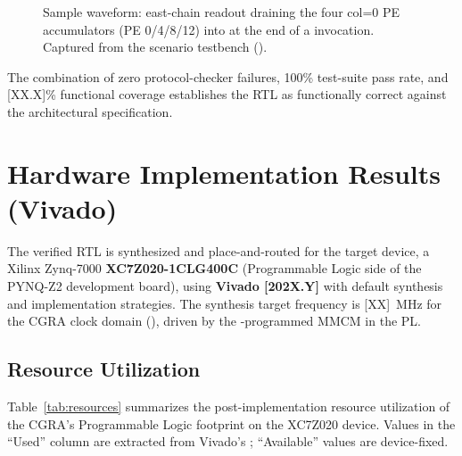 \begin{figure}[!htbp]
\centering
{}
\caption{Sample waveform: east-chain readout draining the four
col=0 PE accumulators (PE 0/4/8/12) into 
at the end of a  invocation. Captured
from the  scenario testbench
().}
\label{fig:wave-fcgroup}
\end{figure}

The combination of zero protocol-checker failures, 100\% test-suite
pass rate, and [XX.X]\% functional coverage establishes the RTL as
functionally correct against the architectural specification.

\section{Hardware Implementation Results (Vivado)}
\label{sec:ch5-impl}

The verified RTL is synthesized and place-and-routed for the target
device, a Xilinx Zynq-7000 \textbf{XC7Z020-1CLG400C} (Programmable
Logic side of the PYNQ-Z2 development board), using
\textbf{Vivado [202X.Y]} with default synthesis and implementation
strategies. The synthesis target frequency is [XX]~MHz for the CGRA
clock domain (), driven by the
-programmed MMCM in the PL.

\subsection{Resource Utilization}
\label{ssec:resources}

Table~\ref{tab:resources} summarizes the post-implementation
resource utilization of the CGRA's Programmable Logic footprint on
the XC7Z020 device. Values in the ``Used'' column are extracted from
Vivado's ; ``Available''
values are device-fixed.

